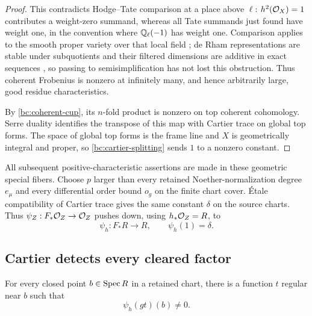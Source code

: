 \begin{proof}
This contradicts Hodge--Tate comparison at a place above $\ell$:
$h^2(\mathcal O_X)=1$ contributes a weight-zero summand, whereas all Tate
summands just found have weight one, in the convention where
$\mathbb Q_\ell(-1)$ has weight one.  Comparison applies to the smooth
proper variety over that local field
\cite[Theorem~1.6 and Corollary~1.8]{Scholze2013}; de Rham representations are stable
under subquotients and their filtered dimensions are additive in
exact sequences \cite[Theorem~5.2.1(2) and Propositions~6.3.2--6.3.3]{BrinonConrad2009},
so passing to semisimplification has not lost this obstruction.  Thus coherent Frobenius is nonzero at infinitely many,
and hence arbitrarily large, good residue characteristics.

By \eqref{bc:coherent-cup}, its $n$-fold product is nonzero on top
coherent cohomology.  Serre duality identifies the transpose of this
map with Cartier trace on global top forms.  The space of global top
forms is the frame line and $X$ is geometrically integral and proper,
so \eqref{bc:cartier-splitting} sends $1$ to a nonzero constant.
\end{proof}

All subsequent positive-characteristic assertions are made in these
geometric special fibers.  Choose $p$ larger than every retained
Noether-normalization degree $e_\mu$ and every differential order bound
$o_g$ on the finite chart cover.  \'{E}tale compatibility of Cartier
trace gives the same constant $\delta$ on the source charts.  Thus
$\psi_Z:F_*\mathcal O_Z\to\mathcal O_Z$ pushes down, using $h_*\mathcal O_Z=R$, to
\[
                  \psi_h:F_*R\longrightarrow R,
                  \qquad\psi_h(1)=\delta.
\]

\subsection{Cartier detects every cleared factor}

\begin{lemma}\label{bc:clearing-test}
For every closed point $b\in\operatorname{Spec} R$ in a retained chart, there is a
function $t$ regular near $b$ such that
\begin{equation}\label{bc:unit-test}
                         \psi_h(gt)(b)\ne0.
\end{equation}
\end{lemma}

